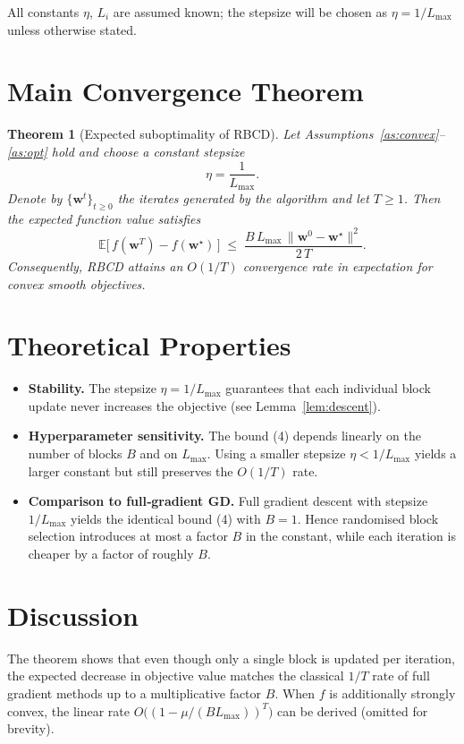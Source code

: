 \documentclass{article}
\newtheorem{theorem}{Theorem}
\newcommand{\E}{\mathbb{E}}
\begin{document}
All constants $\eta$, $L_i$ are assumed known; the stepsize will be chosen as
$\eta = 1/L_{\max}$ unless otherwise stated.

\vspace{0.5em}
\section*{Main Convergence Theorem}
\begin{theorem}[Expected suboptimality of RBCD]\label{thm:main}
Let Assumptions~\ref{as:convex}–\ref{as:opt} hold and choose a constant stepsize
\[
\eta = \frac{1}{L_{\max}} .
\tag{3}
\]
Denote by $\{\bm w^{t}\}_{t\ge 0}$ the iterates generated by the algorithm and let
$T\ge 1$.
Then the expected function value satisfies
\[
\E\!\big[\,f(\bm w^{T})-f(\bm w^{\star})\,\big]
\;\le\;
\frac{B\,L_{\max}\,\|\bm w^{0}-\bm w^{\star}\|^{2}}{2\,T}.
\tag{4}
\]
Consequently, RBCD attains an $O(1/T)$ convergence rate in expectation for
convex smooth objectives.
\end{theorem}

\vspace{0.5em}
\section*{Theoretical Properties}
\begin{itemize}
\item \textbf{Stability.} The stepsize $\eta=1/L_{\max}$ guarantees that each
individual block update never increases the objective (see Lemma~\ref{lem:descent}).
\item \textbf{Hyperparameter sensitivity.} The bound (4) depends linearly on
the number of blocks $B$ and on $L_{\max}$. Using a smaller stepsize
$\eta<1/L_{\max}$ yields a larger constant but still preserves the $O(1/T)$
rate.
\item \textbf{Comparison to full‑gradient GD.} Full gradient descent with stepsize
$1/L_{\max}$ yields the identical bound (4) with $B=1$. Hence randomised block
selection introduces at most a factor $B$ in the constant, while each
iteration is cheaper by a factor of roughly $B$.
\end{itemize}

\vspace{0.5em}
\section*{Discussion}
The theorem shows that even though only a single block is updated per iteration,
the expected decrease in objective value matches the classical $1/T$ rate of
full gradient methods up to a multiplicative factor $B$. When $f$ is additionally
strongly convex, the linear rate $O\big((1-\mu/(B L_{\max}))^{T}\big)$ can be
derived (omitted for brevity).
\end{document}
